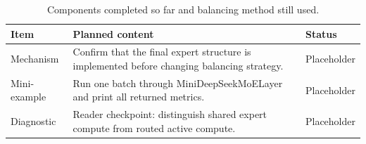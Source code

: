 \begin{table}[H]
\centering
\caption{Components completed so far and balancing method still used.}
\label{tab:ch08-chapter-summary-and-handoff}
\begin{tabularx}{\textwidth}{p{}X p{}}
\toprule
Item & Planned content & Status \\
\midrule
Mechanism & Confirm that the final expert structure is implemented before changing balancing strategy. & Placeholder \\
Mini-example & Run one batch through MiniDeepSeekMoELayer and print all returned metrics. & Placeholder \\
Diagnostic & Reader checkpoint: distinguish shared expert compute from routed active compute. & Placeholder \\
\bottomrule
\end{tabularx}
\end{table}
